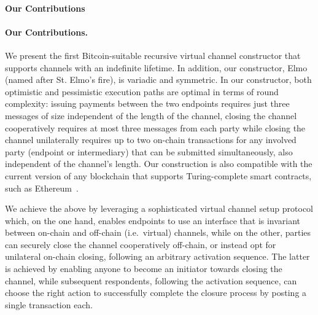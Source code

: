 \makeatletter%
%
  {\paragraph{Our Contributions}}%
  {\paragraph{Our Contributions.}}%
\makeatother%
 We present the first Bitcoin-suitable
recursive virtual channel constructor that supports channels
with an indefinite lifetime. In addition, our constructor, Elmo (named after St.
Elmo's fire), is variadic and symmetric. In our constructor, both optimistic and
pessimistic execution paths are optimal in terms of round complexity: issuing
payments between the two endpoints requires just three messages of size
independent of the length of the channel, closing the channel cooperatively
requires at most three messages from each party while
closing the channel unilaterally requires up to two on-chain transactions for
any involved party (endpoint or intermediary) that can be submitted
simultaneously, also independent of the channel's length. Our
construction is also compatible with the current version of any blockchain that
supports Turing-complete smart contracts, such as
Ethereum~\cite{wood2014ethereum}.

We achieve the above by leveraging a sophisticated virtual channel setup
protocol which, on the one hand, enables endpoints to use an interface that is
invariant between on-chain and off-chain (i.e.\ virtual) channels,
while on the other, parties can securely close the channel cooperatively
off-chain, or instead opt for unilateral on-chain closing, following an arbitrary
activation sequence. The latter is achieved by enabling anyone to
become an initiator towards closing the channel, while subsequent respondents, following the activation sequence, can choose the right action to successfully complete the closure process by posting a single transaction each.

